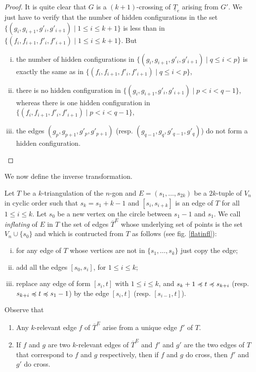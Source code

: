 \documentclass[12pt]{amsart}
\begin{document}
\begin{proof}
It is quite clear that $G$ is a $(k+1)$-crossing of $\underline{T}_e$ arising from $G'$. We just have to verify that the number of hidden configurations in the set $\{(g_i,g_{i+1},g'_i,g'_{i+1})\;|\; 1\le i\le k+1\}$ is less than in $\{(f_i,f_{i+1},f'_i,f'_{i+1})\;|\; 1\le i\le k+1\}$. But
\begin{enumerate}[(i)]
\item the number of hidden configurations in $\{(g_i,g_{i+1},g'_i,g'_{i+1})\;|\; q\le i<p\}$ is exactly the same as in $\{(f_i,f_{i+1},f'_i,f'_{i+1})\;|\; q\le i<p\}$,
\item there is no hidden configuration in $\{(g_i,g_{i+1},g'_i,g'_{i+1})\;|\; p<i<q-1\}$, whereas there is one hidden configuration in $\{(f_i,f_{i+1},f'_i,f'_{i+1})\;|\; p<i<q-1\}$,
\item the edges $(g_p,g_{p+1},g'_p,g'_{p+1})$ (resp. $(g_{q-1},g_q,g'_{q-1},g'_q)$) do not form a hidden configuration.
\end{enumerate}
\end{proof}

\medskip
We now define the inverse transformation.

Let $T$ be a $k$-triangulation of the $n$-gon and $E=(s_1,\ldots,s_{2k})$ be a $2k$-tuple of $V_{n}$ in cyclic order such that $s_k=s_1+k-1$ and $[s_i,s_{i+k}]$ is an edge of $T$ for all $1\le i\le k$.
Let $s_0$ be a new vertex on the circle between $s_1-1$ and $s_1$.
We call \emph{inflating} of $E$ in $T$ the set of edges $\overline{T}^E$ whose underlying set of points is the set $V_n\cup\{s_0\}$ and which is contructed from $T$ as follows (see fig. \ref{flatinfl}):
\begin{enumerate}[(i)]
\item for any edge of $T$ whose vertices are not in $\{s_1,\ldots,s_k\}$ just copy the edge;
\item add all the edges $[s_0,s_i]$, for $1\le i\le k$;
\item replace any edge of form $[s_i,t]$ with $1\le i\le k$, and $s_k+1\preccurlyeq t \preccurlyeq s_{k+i}$ (resp. $s_{k+i}\preccurlyeq t\preccurlyeq s_1-1$) by the edge $[s_i,t]$ (resp. $[s_{i-1},t]$).
\end{enumerate}

\medskip
Observe that 
\begin{enumerate}
\item Any $k$-relevant edge $f$ of $\overline{T}^E$ arise from a unique edge $f'$ of $T$.

\item  If $f$ and $g$ are two $k$-relevant edges of $\overline{T}^E$ and $f'$ and $g'$ are the two edges of $T$ that correspond to $f$ and $g$ respectively, then if $f$ and $g$ do cross, then $f'$ and $g'$ do cross.
\end{enumerate}
\end{document}
